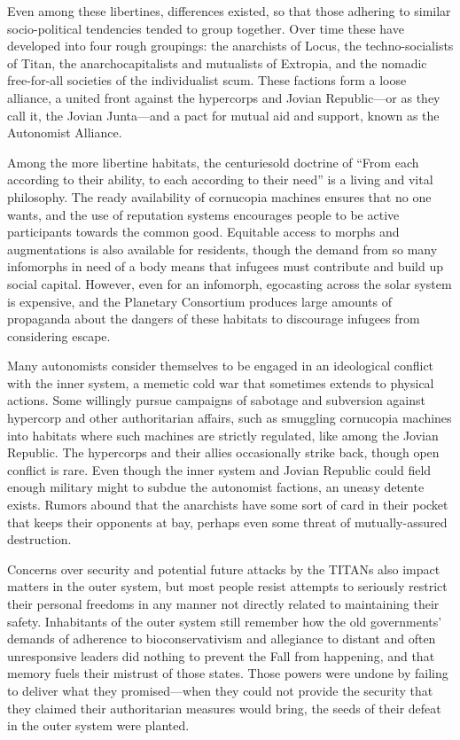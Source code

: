 Even among these libertines, differences existed, so that those
adhering to similar socio-political tendencies tended to group
together. Over time these have developed into four rough groupings:
the anarchists of Locus, the techno-socialists of Titan, the
anarchocapitalists and mutualists of Extropia, and the nomadic
free-for-all societies of the individualist scum.  These factions form
a loose alliance, a united front against the hypercorps and Jovian
Republic—or as they call it, the Jovian Junta—and a pact for mutual
aid and support, known as the Autonomist Alliance.

Among the more libertine habitats, the centuriesold doctrine of “From
each according to their ability, to each according to their need” is a
living and vital philosophy. The ready availability of cornucopia
machines ensures that no one wants, and the use of reputation systems
encourages people to be active participants towards the common
good. Equitable access to morphs and augmentations is also available
for residents, though the demand from so many infomorphs in need of a
body means that infugees must contribute and build up social
capital. However, even for an infomorph, egocasting across the solar
system is expensive, and the Planetary Consortium produces large
amounts of propaganda about the dangers of these habitats to
discourage infugees from considering escape.

Many autonomists consider themselves to be engaged in an ideological
conflict with the inner system, a memetic cold war that sometimes
extends to physical actions. Some willingly pursue campaigns of
sabotage and subversion against hypercorp and other authoritarian
affairs, such as smuggling cornucopia machines into habitats where
such machines are strictly regulated, like among the Jovian Republic.
The hypercorps and their allies occasionally strike back, though open
conflict is rare. Even though the inner system and Jovian Republic
could field enough military might to subdue the autonomist factions,
an uneasy detente exists. Rumors abound that the anarchists have some
sort of card in their pocket that keeps their opponents at bay,
perhaps even some threat of mutually-assured destruction.

Concerns over security and potential future attacks by the TITANs also
impact matters in the outer system, but most people resist attempts to
seriously restrict their personal freedoms in any manner not directly
related to maintaining their safety. Inhabitants of the outer system
still remember how the old governments' demands of adherence to
bioconservativism and allegiance to distant and often unresponsive
leaders did nothing to prevent the Fall from happening, and that
memory fuels their mistrust of those states.  Those powers were undone
by failing to deliver what they promised—when they could not provide
the security that they claimed their authoritarian measures would
bring, the seeds of their defeat in the outer system were planted.

